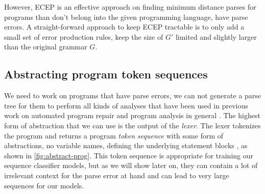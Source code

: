 However, ECEP is an effective approach on finding minimum distance parses for
programs than don't belong into the given programming language, \ie have parse
errors. A straight-forward approach to keep ECEP tractable is to only add a
small set of error production rules, \ie keep the size of $G'$ limited and
slightly larger than the original grammar $G$.







\subsection{Abstracting program token sequences}
\label{sec:overview:abstraction}

We need to work on programs that have parse errors, \ie we can not generate a
parse tree for them to perform all kinds of analyses that have been used in
previous work on automated program repair \citep{?} and program analysis in
general \citep{?}.
%
The highest form of abstraction that we can use is the output of the
\emph{lexer}. The lexer tokenizes the program and returns a program \emph{token
sequence} with some form of abstractions, \eg no variable names, defining the
underlying statement blocks \etc, as shown in \autoref{fig:abstract-prog}.
This token sequence is appropriate for training our sequence classifier models,
but as we will show later on, they can contain a lot of irrelevant context for
the parse error at hand and can lead to very large sequences for our models.

